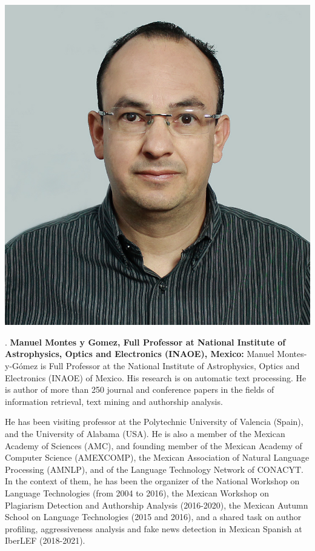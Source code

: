 \vspace{1em}
\begin{center}
\includegraphics[width=0.3\linewidth]{content/mexican_nlp/manuel.png}
\end{center}.
{\bfseries Manuel Montes y Gomez, Full Professor at National Institute of Astrophysics, Optics and Electronics (INAOE), Mexico:}
Manuel Montes-y-G\'omez is Full Professor at the National Institute of Astrophysics, Optics and Electronics (INAOE) of Mexico. His research is on automatic text processing. He is author of more than 250 journal and conference papers in the fields of information retrieval, text mining and authorship analysis.

He has been visiting professor at the Polytechnic University of Valencia (Spain), and the University of Alabama (USA). He is also a member of the Mexican Academy of Sciences (AMC), and founding member of the Mexican Academy of Computer Science (AMEXCOMP), the Mexican Association of Natural Language Processing (AMNLP), and of the Language Technology Network of CONACYT. In the context of them, he has been the organizer of the National Workshop on Language Technologies (from 2004 to 2016), the Mexican Workshop on Plagiarism Detection and Authorship Analysis (2016-2020), the Mexican Autumn School on Language Technologies (2015 and 2016), and a shared task on author profiling, aggressiveness analysis and fake news detection in Mexican Spanish at IberLEF (2018-2021).

